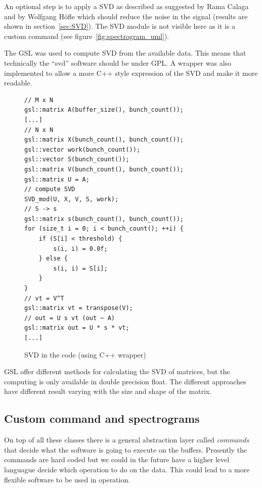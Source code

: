 An optional step is to apply a \gls{SVD} as described as suggested by Rama Calaga~\cite{PhysRevSTAB.7.042801} and by Wolfgang H{\"o}f\/le\cite{HofleChamonix12} which should reduce the noise in the signal (results are shown in section~\ref{sec:SVD}). The \gls{SVD} module is not visible here as it is a custom command (see figure~\ref{fig:spectrogram_uml}).

The \gls{GSL} was used to compute SVD from the available data. This means that technically the ``svd'' software should be under \gls{GPL}. A wrapper was also implemented to allow a more C++ style expression of the \gls{SVD} and make it more readable.

\begin{figure}[H]
\centering
\caption{SVD in the code (using C++ wrapper)}
\begin{lstlisting}
// M x N
gsl::matrix A(buffer_size(), bunch_count());
[...]
// N x N
gsl::matrix X(bunch_count(), bunch_count());
gsl::vector work(bunch_count());
gsl::vector S(bunch_count());
gsl::matrix V(bunch_count(), bunch_count());
gsl::matrix U = A;
// compute SVD
SVD_mod(U, X, V, S, work);
// S -> s
gsl::matrix s(bunch_count(), bunch_count());
for (size_t i = 0; i < bunch_count(); ++i) {
	if (S[i] < threshold) {
		s(i, i) = 0.0f;
	} else {
		s(i, i) = S[i];
	}
}
// vt = V^T
gsl::matrix vt = transpose(V);
// out = U s vt (out ~ A)
gsl::matrix out = U * s * vt;
[...]
\end{lstlisting}
\end{figure}

\Gls{GSL} offer different methods for calculating the \gls{SVD} of matrices, but the computing is only available in double precision float. The different approaches have different result varying with the size and shape of the matrix.

\subsection{Custom command and spectrograms}

On top of all these classes there is a general abstraction layer called \emph{commands} that decide what the software is going to execute on the buffers. Presently the commands are hard coded but we could in the future have a higher level languague decide which operation to do on the data. This could lead to a more flexible software to be used in operation.

